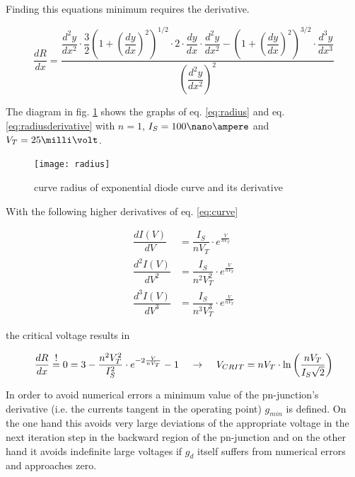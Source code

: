Finding this equations minimum requires the derivative.

\begin{equation}
\dfrac{dR}{dx} = \dfrac{\dfrac{d^{2}y}{dx^{2}} \cdot \dfrac{3}{2}\left(1+\left(\dfrac{dy}{dx}\right)^{2}\right)^{1/2} \cdot 2 \cdot \dfrac{dy}{dx} \cdot \dfrac{d^{2}y}{dx^{2}} - \left(1+\left(\dfrac{dy}{dx}\right)^{2}\right)^{3/2} \cdot \dfrac{d^{3}y}{dx^{3}}}{\left(\dfrac{d^{2}y}{dx^{2}}\right)^{2}}
\label{eq:radiusderivative}
\end{equation}

The diagram in fig. \ref{fig:radius} shows the graphs of
eq. \eqref{eq:radius} and eq. \eqref{eq:radiusderivative} with $n=1$,
$I_{S}=100\nano\ampere$ and $V_{T}=25\milli\volt$.

\begin{figure}[ht]
\begin{center}
\texttt{[image: radius]}
\end{center}
\caption{curve radius of exponential diode curve and its derivative}
\label{fig:radius}
\end{figure}
\FloatBarrier

With the following higher derivatives of eq. \eqref{eq:curve}

\begin{align}
\dfrac{d I\left(V\right)}{dV} &= \dfrac{I_{S}}{n V_{T}}\cdot e^{\frac{V}{n V_{T}}}\\
\dfrac{d^{2} I\left(V\right)}{dV^{2}} &= \dfrac{I_{S}}{n^{2} V_{T}^{2}}\cdot e^{\frac{V}{n V_{T}}}\\
\dfrac{d^{3} I\left(V\right)}{dV^{3}} &= \dfrac{I_{S}}{n^{3} V_{T}^{3}}\cdot e^{\frac{V}{n V_{T}}}
\end{align}

the critical voltage results in

\begin{equation}
\dfrac{dR}{dx} \;\shortstack{!\\=}\; 0 = 3 - \dfrac{n^{2} V_{T}^{2}}{I_{S}^{2}}\cdot e^{-2\frac{V}{n V_{T}}} - 1
\;\;\;\; \rightarrow \;\;\;\;
V_{CRIT} = n V_{T}\cdot \ln{\left(\dfrac{n V_{T}}{I_{S} \sqrt{2}}\right)}
\end{equation}

In order to avoid numerical errors a minimum value of the
pn-junction's derivative (i.e. the currents tangent in the operating
point) $g_{min}$ is defined.  On the one hand this avoids very large
deviations of the appropriate voltage in the next iteration step in
the backward region of the pn-junction and on the other hand it avoids
indefinite large voltages if $g_d$ itself suffers from numerical
errors and approaches zero.

